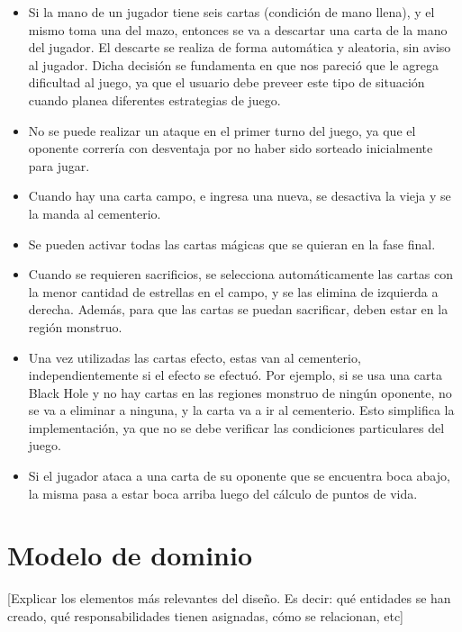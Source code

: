 \begin{itemize}
	\item Si la mano de un jugador tiene seis cartas (condición de mano llena), y el mismo toma una del mazo, entonces se va a descartar una carta de la mano del jugador. El descarte se realiza de forma automática y aleatoria, sin aviso al jugador. Dicha decisión se fundamenta en que nos pareció que le agrega dificultad al juego, ya que el usuario debe preveer este tipo de situación cuando planea diferentes estrategias de juego.
	
	\item No se puede realizar un ataque en el primer turno del juego, ya que el oponente correría con desventaja por no haber sido sorteado inicialmente para jugar.
	
	\item Cuando hay una carta campo, e ingresa una nueva, se desactiva la vieja y se la manda al cementerio.
	
	\item Se pueden activar todas las cartas mágicas que se quieran en la fase final.
	
	\item Cuando se requieren sacrificios, se selecciona automáticamente las cartas con la menor cantidad de estrellas 
	en el campo, y se las elimina de izquierda a derecha. Además, para que las cartas se puedan sacrificar, deben estar 
	en la región monstruo.
	
	\item Una vez utilizadas las cartas efecto, estas van al cementerio, independientemente si el efecto se efectuó. Por ejemplo, si se usa una carta Black Hole y no hay cartas en las regiones monstruo de ningún oponente, no se va a eliminar a ninguna, y la carta va a ir al cementerio. Esto simplifica la implementación, ya que no se debe verificar las condiciones particulares del juego.
	
	\item Si el jugador ataca a una carta de su oponente que se encuentra boca abajo, la misma pasa a estar boca arriba luego del cálculo de puntos de vida.
\end{itemize}

\section{Modelo de dominio}

[Explicar los elementos más relevantes del diseño. Es decir: qué
entidades se han creado, qué responsabilidades tienen asignadas, cómo
se relacionan, etc]

